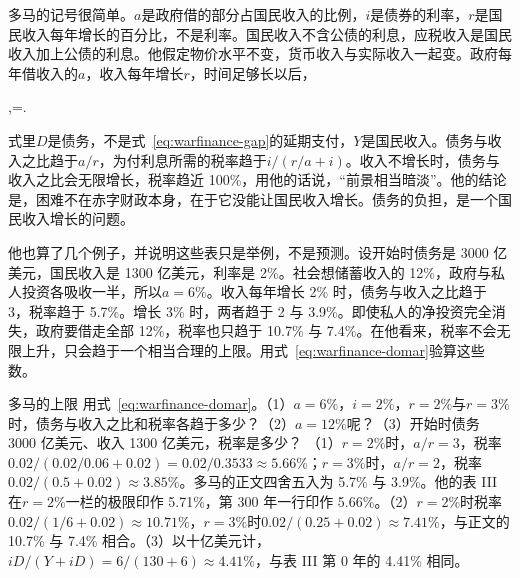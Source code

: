 多马的记号很简单。$a$是政府借的部分占国民收入的比例，$i$是债券的利率，$r$是国民收入每年增长的百分比，不是利率\cite{domar1944}。国民收入不含公债的利息，应税收入是国民收入加上公债的利息\cite{domar1944}。他假定物价水平不变，货币收入与实际收入一起变\cite{domar1944}。政府每年借收入的$a$，收入每年增长$r$，时间足够长以后，
\begin{keyeq}
\;\longrightarrow\;,\qquad {}=\;\longrightarrow\;.\label{eq:warfinance-domar}
\end{keyeq}
式里$D$是债务，不是式~\eqref{eq:warfinance-gap}的延期支付，$Y$是国民收入。债务与收入之比趋于$a/r$，为付利息所需的税率趋于$i/(r/a+i)$\cite{domar1944}。收入不增长时，债务与收入之比会无限增长，税率趋近 100\%，用他的话说，“前景相当暗淡”\cite{domar1944}。他的结论是，困难不在赤字财政本身，在于它没能让国民收入增长\cite{domar1944}。债务的负担，是一个国民收入增长的问题\cite{domar1944}。

他也算了几个例子，并说明这些表只是举例，不是预测\cite{domar1944}。设开始时债务是 3000 亿美元，国民收入是 1300 亿美元，利率是 2\%\cite{domar1944}。社会想储蓄收入的 12\%，政府与私人投资各吸收一半，所以$a=6\%$\cite{domar1944}。收入每年增长 2\% 时，债务与收入之比趋于 3，税率趋于 5.7\%\cite{domar1944}。增长 3\% 时，两者趋于 2 与 3.9\%\cite{domar1944}。即使私人的净投资完全消失，政府要借走全部 12\%，税率也只趋于 10.7\% 与 7.4\%\cite{domar1944}。在他看来，税率不会无限上升，只会趋于一个相当合理的上限\cite{domar1944}。用式~\eqref{eq:warfinance-domar}验算这些数。

\begin{example}{多马的上限}\label{ex:warfinance-domar}
用式~\eqref{eq:warfinance-domar}。（1）$a=6\%$，$i=2\%$，$r=2\%$与$r=3\%$时，债务与收入之比和税率各趋于多少？（2）$a=12\%$呢？（3）开始时债务 3000 亿美元、收入 1300 亿美元，税率是多少？
\solution
（1）$r=2\%$时，$a/r=3$，税率$0.02/(0.02/0.06+0.02)=0.02/0.3533\approx5.66\%$；$r=3\%$时，$a/r=2$，税率$0.02/(0.5+0.02)\approx3.85\%$。多马的正文四舍五入为 5.7\% 与 3.9\%。他的表 III 在$r=2\%$一栏的极限印作 5.71\%，第 300 年一行印作 5.66\%。（2）$r=2\%$时税率$0.02/(1/6+0.02)\approx10.71\%$，$r=3\%$时$0.02/(0.25+0.02)\approx7.41\%$，与正文的 10.7\% 与 7.4\% 相合。（3）以十亿美元计，$iD/(Y+iD)=6/(130+6)\approx4.41\%$，与表 III 第 0 年的 4.41\% 相同。
\end{example}

